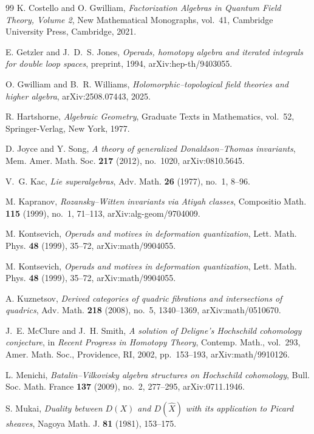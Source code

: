 \begin{thebibliography}{99}
K. Costello and O. Gwilliam, \emph{Factorization Algebras in Quantum Field Theory, Volume 2}, New Mathematical Monographs, vol.~41, Cambridge University Press, Cambridge, 2021.

E. Getzler and J.~D.~S. Jones, \emph{Operads, homotopy algebra and iterated integrals for double loop spaces}, preprint, 1994, arXiv:hep-th/9403055.

O. Gwilliam and B.~R. Williams, \emph{Holomorphic--topological field theories and higher algebra}, arXiv:2508.07443, 2025.

R. Hartshorne, \emph{Algebraic Geometry}, Graduate Texts in Mathematics, vol.~52, Springer-Verlag, New York, 1977.

D. Joyce and Y. Song, \emph{A theory of generalized Donaldson--Thomas invariants}, Mem. Amer. Math. Soc. \textbf{217} (2012), no.~1020, arXiv:0810.5645.

V.~G. Kac, \emph{Lie superalgebras}, Adv. Math. \textbf{26} (1977), no.~1, 8--96.

M. Kapranov, \emph{Rozansky--Witten invariants via Atiyah classes}, Compositio Math. \textbf{115} (1999), no.~1, 71--113, arXiv:alg-geom/9704009.

M. Kontsevich, \emph{Operads and motives in deformation quantization}, Lett. Math. Phys. \textbf{48} (1999), 35--72, arXiv:math/9904055.

M. Kontsevich, \emph{Operads and motives in deformation quantization}, Lett. Math. Phys. \textbf{48} (1999), 35--72, arXiv:math/9904055.

A. Kuznetsov, \emph{Derived categories of quadric fibrations and intersections of quadrics}, Adv. Math. \textbf{218} (2008), no.~5, 1340--1369, arXiv:math/0510670.

J.~E. McClure and J.~H. Smith, \emph{A solution of Deligne's Hochschild cohomology conjecture}, in \emph{Recent Progress in Homotopy Theory}, Contemp. Math., vol.~293, Amer. Math. Soc., Providence, RI, 2002, pp.~153--193, arXiv:math/9910126.

L. Menichi, \emph{Batalin--Vilkovisky algebra structures on Hochschild cohomology}, Bull. Soc. Math. France \textbf{137} (2009), no.~2, 277--295, arXiv:0711.1946.

S. Mukai, \emph{Duality between $D(X)$ and $D(\widehat X)$ with its application to Picard sheaves}, Nagoya Math. J. \textbf{81} (1981), 153--175.


\end{thebibliography}
